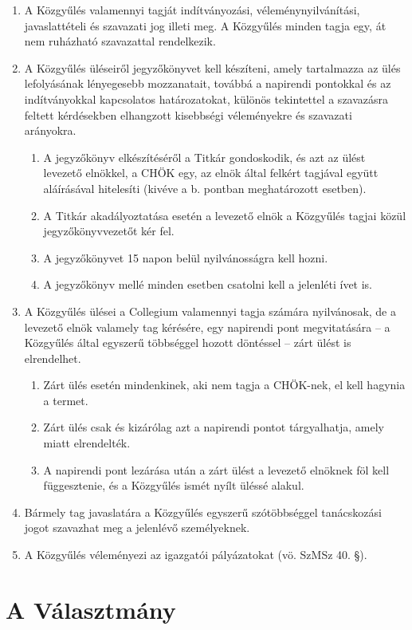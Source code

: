 \documentclass{rulebook}
\begin{document}
\begin{enumerate}
	\item A Közgyűlés valamennyi tagját indítványozási, véleménynyilvánítási, javaslattételi és szavazati jog illeti meg. A Közgyűlés minden tagja egy, át nem ruházható szavazattal rendelkezik.
	\item A Közgyűlés üléseiről jegyzőkönyvet kell készíteni, amely tartalmazza az ülés lefolyásának lényegesebb mozzanatait, továbbá a napirendi pontokkal és az indítványokkal kapcsolatos határozatokat, különös tekintettel a szavazásra feltett kérdésekben elhangzott kisebbségi véleményekre és szavazati arányokra.
	\begin{enumerate}
		\item A jegyzőkönyv elkészítéséről a Titkár gondoskodik, és azt az ülést levezető elnökkel, a CHÖK egy, az elnök által felkért tagjával együtt aláírásával hitelesíti (kivéve a b. pontban meghatározott esetben).
		\item A Titkár akadályoztatása esetén a levezető elnök a Közgyűlés tagjai közül jegyzőkönyvvezetőt kér fel.
		\item A jegyzőkönyvet 15 napon belül nyilvánosságra kell hozni.
		\item A jegyzőkönyv mellé minden esetben csatolni kell a jelenléti ívet is.
	\end{enumerate}
	\item A Közgyűlés ülései a Collegium valamennyi tagja számára nyilvánosak, de a levezető elnök valamely tag kérésére, egy napirendi pont megvitatására – a Közgyűlés által egyszerű többséggel hozott döntéssel – zárt ülést is elrendelhet.
	\begin{enumerate}
		\item Zárt ülés esetén mindenkinek, aki nem tagja a CHÖK-nek, el kell hagynia a termet.
		\item Zárt ülés csak és kizárólag azt a napirendi pontot tárgyalhatja, amely miatt elrendelték.
		\item A napirendi pont lezárása után a zárt ülést a levezető elnöknek föl kell függesztenie, és a Közgyűlés ismét nyílt üléssé alakul.
	\end{enumerate}	
	\item Bármely tag javaslatára a Közgyűlés egyszerű szótöbbséggel tanácskozási jogot szavazhat meg a jelenlévő személyeknek.
	\item A Közgyűlés véleményezi az igazgatói pályázatokat (vö. SzMSz 40. §).

\end{enumerate}


\section{A Választmány}
\end{document}
